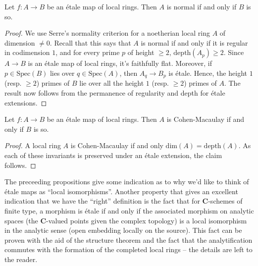 \begin{proposition}
\label{proposition-etale-normal}
Let $f : A \to B$ be an \'etale map of local rings. Then $A$ is normal if and
only if $B$ is so.
\end{proposition}

\begin{proof}
We use Serre's normality criterion for a noetherian local ring $A$ of
dimension $\neq 0$. Recall that this says that $A$ is normal if and only if
it is regular in codimension $1$, and for every prime $p$ of height $\geq 2$,
$\mathrm{depth}(A_p) \geq 2$. Since $A \to B$ is an \'etale map of local
rings, it's faithfully flat. Moreover, if $p \in \text{Spec}(B)$ lies over
$q \in \text{Spec}(A)$, then $A_q \to B_p$ is \'etale. Hence, the height $1$
(resp. $\geq 2$) primes of $B$ lie over all the height $1$ (resp. $\geq 2$)
primes of $A$. The result now follows from the permanence of regularity and
depth for \'etale extensions.
\end{proof}

\begin{proposition}
\label{proposition-etale-CM}
Let $f : A \to B$ be an \'etale map of local rings. Then $A$ is Cohen-Macaulay
if and only if $B$ is so.
\end{proposition}
\begin{proof}
A local ring $A$ is Cohen-Macaulay if and only
$\mathrm{dim}(A) = \mathrm{depth}(A)$. As each of these invariants is
preserved under an \'etale extension, the claim follows.
\end{proof}

\noindent
The preceeding propositions give some indication as to why we'd like to think
of \'etale maps as ``local isomorphisms''. Another property that gives an
excellent indication that we have the ``right'' definition is the fact that
for $\mathbf{C}$-schemes of finite type, a morphism is \'etale if and only if
the
associated morphism on analytic spaces (the $\mathbf{C}$-valued points given the
complex topology) is a local isomorphism in the analytic sense (open
embedding locally on the source). This fact can be proven with the aid of the
structure theorem and the fact that the analytification commutes with the
formation of the completed local rings -- the details are left to the reader.









